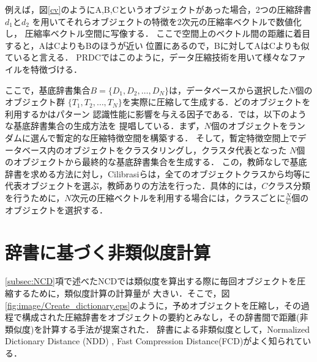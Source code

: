 例えば，図\ref{cv}のようにA,B,Cというオブジェクトがあった場合，2つの圧縮辞書$d_1$と$d_2$
を用いてそれらオブジェクトの特徴を2次元の圧縮率ベクトルで数値化し，
圧縮率ベクトル空間に写像する．
ここで空間上のベクトル間の距離に着目すると，AはCよりもBのほうが近い
位置にあるので，Bに対してAはCよりも似ていると言える．
PRDCではこのように，データ圧縮技術を用いて様々なファイルを特徴づける．


ここで，基底辞書集合$B=\{D_1,D_2,\dots,D_N\}$は，データベースから選択した$N$個のオブジェクト群
$\{T_1,T_2,\dots,T_N\}$を実際に圧縮して生成する．どのオブジェクトを利用するかはパターン
認識性能に影響を与える因子である．\cite{PRDC}では，以下のような基底辞書集合の生成方法を
提唱している．まず，$N$個のオブジェクトをランダムに選んで暫定的な圧縮特徴空間を構築する．
そして，暫定特徴空間上でデータベース内のオブジェクトをクラスタリングし，クラスタ代表となった
$N$個のオブジェクトから最終的な基底辞書集合を生成する．
この，教師なしで基底辞書を求める方法に対し，Cilibrasiら\cite{cilibrasi2007statistical}は，全てのオブジェクトクラスから均等に代表オブジェクトを選ぶ，教師ありの方法を行った．具体的には，$C$クラス分類を行うために，$N$次元の圧縮ベクトルを利用する場合には，クラスごとに$\frac{N}{C}$個のオブジェクトを選択する．

\section{辞書に基づく非類似度計算}
\ref{subsec:NCD}項で述べたNCDでは類似度を算出する際に毎回オブジェクトを圧縮するために，類似度計算の計算量が
大きい．そこで，図\ref{fig:image/Create_dictionary.eps}のように，予めオブジェクトを圧縮し，その過程で構成された圧縮辞書をオブジェクトの要約とみなし，その辞書間で距離(非類似度)を計算する手法が提案された．
辞書による非類似度として，Normalized Dictionary Distance (NDD) \cite{NDD}, Fast Compression Distance(FCD)\cite{cerra2012fast}がよく知られている．

